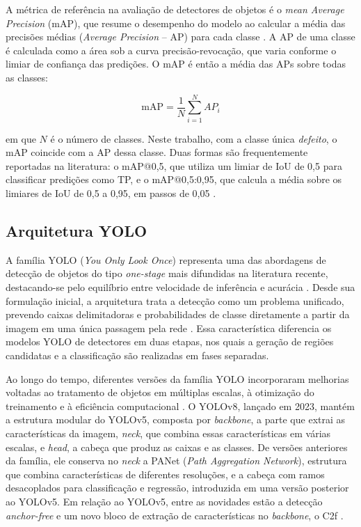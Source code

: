 \documentclass[
    12pt,                %
    openright,           %
    oneside,             %
    a4paper,             %
    english,             %
    brazil               %
]{abntex2}
\begin{document}
A métrica de referência na avaliação de detectores de objetos
é o \textit{mean Average Precision} (mAP), que resume o
desempenho do modelo ao calcular a média das precisões médias
(\textit{Average Precision} -- AP) para cada classe
\cite{Ramos2025}. A AP de uma classe é calculada como a área
sob a curva precisão-revocação, que varia conforme o limiar
de confiança das predições. O mAP é então a média das APs
sobre todas as classes:

\begin{equation}
    \text{mAP} = \frac{1}{N} \sum_{i=1}^{N} AP_i
\end{equation}

em que $N$ é o número de classes. Neste trabalho, com a classe
única \textit{defeito}, o mAP coincide com a AP dessa classe. Duas
formas são frequentemente reportadas na literatura: o mAP@0,5,
que utiliza um limiar de IoU de 0,5 para classificar predições como
TP, e o mAP@0,5:0,95, que calcula a média sobre os limiares de IoU
de 0,5 a 0,95, em passos de 0,05 \cite{Ramos2025}.


\subsection{Arquitetura YOLO}
\label{subsec:yolo}

A família YOLO (\textit{You Only Look Once}) representa uma das abordagens
de detecção de objetos do tipo \textit{one-stage} mais difundidas na literatura
recente, destacando-se pelo equilíbrio entre velocidade de inferência e acurácia
\cite{Ramos2025}. Desde sua formulação inicial, a arquitetura trata a detecção
como um problema unificado, prevendo caixas delimitadoras e probabilidades de
classe diretamente a partir da imagem em uma única passagem pela rede
\cite{Hussain2023}. Essa característica diferencia os modelos YOLO de detectores
em duas etapas, nos quais a geração de regiões candidatas e a classificação são
realizadas em fases separadas.

Ao longo do tempo, diferentes versões da família YOLO incorporaram melhorias
voltadas ao tratamento de objetos em múltiplas escalas, à otimização do
treinamento e à eficiência computacional \cite{Hussain2023,Ramos2025}. O YOLOv8,
lançado em 2023, mantém a estrutura modular do YOLOv5, composta por \textit{backbone},
a parte que extrai as características da imagem, \textit{neck}, que
combina essas características em várias escalas, e \textit{head}, a
cabeça que produz as caixas e as classes. De versões anteriores da
família, ele conserva no \textit{neck} a PANet (\textit{Path
Aggregation Network}), estrutura que combina características de
diferentes resoluções, e a cabeça com ramos desacoplados para
classificação e regressão, introduzida em uma versão posterior ao
YOLOv5. Em relação ao YOLOv5, entre as novidades estão a
detecção \textit{anchor-free} e um novo bloco de extração de
características no \textit{backbone}, o C2f \cite{Ramos2025}.
\end{document}
